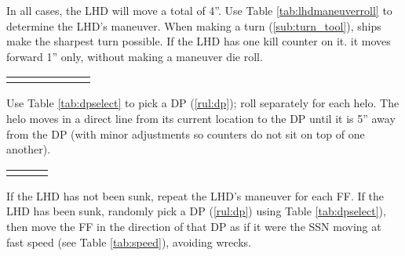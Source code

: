 \documentclass[../TacSubMicroRules.tex]{subfiles}
\begin{document}
 
In all cases, the LHD will move a total of 4''.
Use Table \ref{tab:lhdmaneuverroll} to determine the LHD's maneuver.
When making a turn (\ref{sub:turn_tool}), ships make the sharpest turn possible.
If the LHD has one kill counter on it. it moves forward 1'' only, without making a maneuver die roll.
\begin{Table}
    \centering
    \begin{tabular}{R{0.15\linewidth}|L{0.65\linewidth}}
       \hline
       \hline
       \hline
    \end{tabular}
    \label{tab:lhdmaneuverroll}
\end{Table}

 
Use Table \ref{tab:dpselect} to pick a DP (\ref{rul:dp}); roll separately for each helo.
The helo moves in a direct line from its current location to the DP until it is 5'' away from the DP (with minor adjustments so counters do not sit on top of one another).
\begin{Table}
    \centering
    \begin{tabular}{R{0.3\linewidth}|L{0.3\linewidth}}
       \hline
       \hline
       \hline
    \end{tabular}
    \label{tab:dpselect}
\end{Table}

 
If the LHD has not been sunk, repeat the LHD's maneuver for each FF.
If the LHD has been sunk, randomly pick a DP (\ref{rul:dp}) using Table \ref{tab:dpselect}), then move the FF in the direction of that DP as if it were the SSN moving at fast speed (see Table \ref{tab:speed}), avoiding wrecks.
\end{document}
